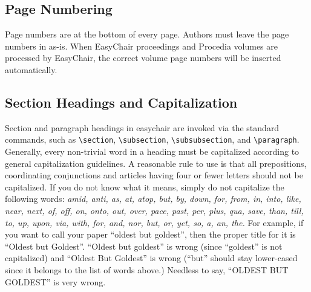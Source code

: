 \documentclass{easychair}
\newcommand{\easychair}{\textsf{easychair}}
\begin{document}
\subsection{Page Numbering}
\label{sect:page-numbering}

Page numbers are at the bottom of every page. Authors must leave the
page numbers in as-is. When EasyChair proceedings and Procedia volumes are processed by
EasyChair, the correct volume page numbers will be inserted
automatically.

\subsection{Section Headings and Capitalization}
\label{sect:section-headings}

Section and paragraph headings in {\easychair} are invoked via the standard 
commands, such as
\verb+\section+,
\verb+\subsection+,
\verb+\subsubsection+, and
\verb+\paragraph+.
Generally, every non-trivial word in a heading must be capitalized according to
general capitalization guidelines. A reasonable rule to use is that
all prepositions, coordinating conjunctions and articles having four
or fewer letters should not be capitalized. If you do not know what it
means, simply do not capitalize the following words:
\textit{amid, anti, as, at, atop, but, by, down, for, from, in, into, like,
near, next, of, off, on, onto, out, over, pace, past, per, plus, qua,
save, than, till, to, up, upon, via, with, for, and, nor, but, or,
yet, so, a, an, the.} For example, if you want to call your paper
``oldest but goldest'', then the proper title for it is ``Oldest but
Goldest''. ``Oldest but goldest'' is wrong (since ``goldest'' is not
capitalized) and ``Oldest But Goldest'' is wrong (``but'' should stay
lower-cased since it belongs to the list of words above.) Needless to
say, ``OLDEST BUT GOLDEST'' is very wrong.
\end{document}
